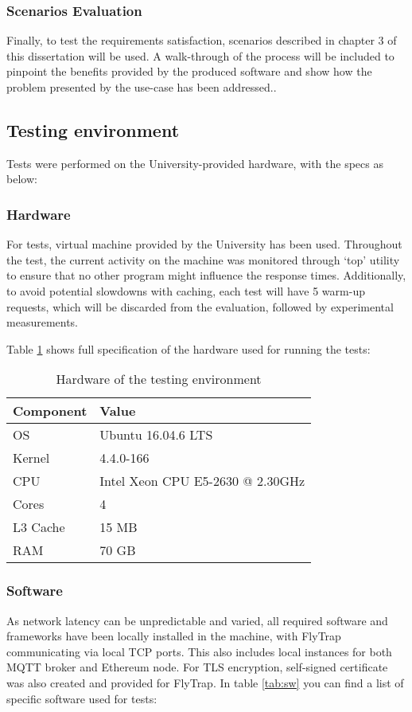 \subsubsection{Scenarios Evaluation}
Finally, to test the requirements satisfaction, scenarios described in chapter 3 of this dissertation will be used. A walk-through of the process will be included to pinpoint the benefits provided by the produced software and show how the problem presented by the use-case has been addressed..

\subsection{Testing environment}
Tests were performed on the University-provided hardware, with the specs as below:
\subsubsection{Hardware}
For tests, virtual machine provided by the University has been used. Throughout the test, the current activity on the machine was monitored through `top' utility to ensure that no other program might influence the response times. Additionally, to avoid potential slowdowns with caching, each test will have 5 warm-up requests, which will be discarded from the evaluation, followed by experimental measurements.

Table \ref{tab:hw} shows full specification of the hardware used for running the tests:
\begin{table}[h]
\centering
\begin{tabular}{|l|l|}
\hline
\textbf{Component} & \textbf{Value}                   \\ \hline
OS                 & Ubuntu 16.04.6 LTS               \\ \hline
Kernel             & 4.4.0-166                        \\ \hline
CPU                & Intel Xeon CPU E5-2630 @ 2.30GHz \\ \hline
Cores              & 4                                \\ \hline
L3 Cache           & 15 MB                            \\ \hline
RAM                & 70 GB                            \\ \hline
\end{tabular}
\caption{Hardware of the testing environment}
\label{tab:hw}
\end{table}
\subsubsection{Software}
As network latency can be unpredictable and varied, all required software and frameworks have been locally installed in the machine, with FlyTrap communicating via local TCP ports. This also includes local instances for both MQTT broker and Ethereum node. For TLS encryption, self-signed certificate was also created and provided for FlyTrap. In table \ref{tab:sw} you can find a list of specific software used for tests:

